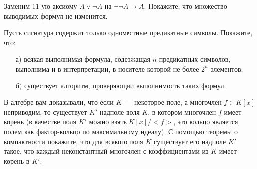 \begin{ptask}{58}
	Заменим 11-ую аксиому $A \lor \lnot A$ на $\lnot \lnot A \to A$. Покажите, что множество выводимых формул не изменится.
\end{ptask}


\begin{ptask}{59}
	Пусть сигнатура содержит только одноместные предикатные символы. Покажите, что:
    \begin{enumerate}[topsep = 0pt, itemsep = -1ex]
        \item [а)] всякая выполнимая формула, содержащая $n$ предикатных символов, выполнима и в интерпретации, в
			носителе которой не более $2^n$ элементов;
        \item [б)] существует алгоритм, проверяющий выполнимость таких формул.
    \end{enumerate}
\end{ptask}

\begin{ptask}{66}
    В алгебре вам доказывали, что если $K$~--- некоторое поле, а многочлен $f \in K[x]$ неприводим, то существует $K'$
    надполе поля $K$, в котором многочлен $f$ имеет корень (в качестве поля $K'$ можно взять $K[x] / {<}f{>}$, это
    кольцо является полем как фактор-кольцо по максимальному идеалу). С помощью теоремы о компактности покажите, что для
    всякого поля $K$ существует его надполе $K'$ такое, что каждый неконстантный многочлен с коэффициентами из $K$ имеет
    корень в $K'$.
\end{ptask}

